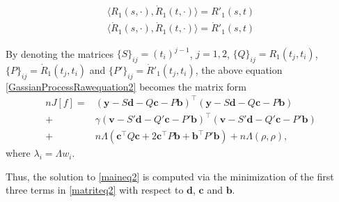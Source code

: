 \begin{align}
\langle R_1(s,\cdot),\dot{R}_1(t,\cdot)\rangle = R'_1(s,t) \\
\langle \dot{R}_1(s,\cdot),\dot{R}_1(t,\cdot)\rangle = \dot{R}'_1(s,t) 
\end{align}


By denoting the matrices $\{S\}_{ij}=(t_i)^{j-1}$, $j=1,2$, $\{Q\}_{ij}=R_1(t_j,t_i)$, $\{P\}_{ij}=\dot{R}_1(t_j,t_i)$ and $\{P'\}_{ij}=\dot{R}'_1(t_j,t_i)$, the above equation \eqref{GassianProcessRawequation2} becomes the matrix form 
\begin{equation}\label{matriteq2}
\begin{split}
nJ[f]=&\left(\mathbf{y}-S\mathbf{d}-Q\mathbf{c}-P\mathbf{b}\right)^\top \left(\mathbf{y}-S\mathbf{d}-Q\mathbf{c}-P\mathbf{b}\right)\\
+&\gamma\left(\mathbf{v}-S'\mathbf{d}-Q'\mathbf{c}-P'\mathbf{b}\right)^\top \left(\mathbf{v}-S'\mathbf{d}-Q'\mathbf{c}-P'\mathbf{b}\right)\\
+&n\Lambda\left(\mathbf{c}^\top Q\mathbf{c} + 2\mathbf{c}^\top P\mathbf{b}+ \mathbf{b}^\top P'\mathbf{b}\right)+n\Lambda(\rho,\rho),
\end{split}
\end{equation}
where $\lambda_i=\Lambda w_i$. 

Thus, the solution to \eqref{maineq2} is computed via the minimization of the first three terms in \eqref{matriteq2} with respect to $\mathbf{d}$, $\mathbf{c}$ and $\mathbf{b}$.

